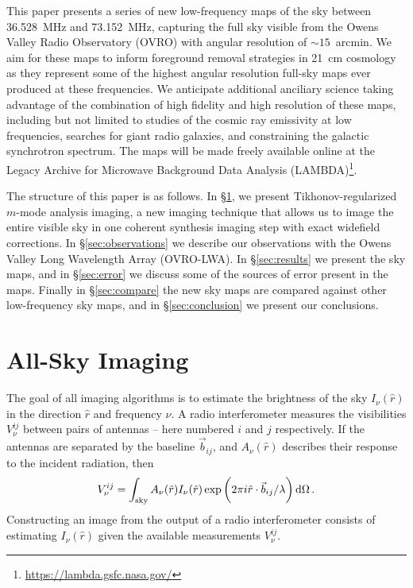 \documentclass[twocolumn]{aastex61}
\renewcommand{\d}{{\rm d}}
\begin{document}
This paper presents a series of new low-frequency maps of the sky between 36.528~MHz and 73.152~MHz,
capturing the full sky visible from the Owens Valley Radio Observatory (OVRO) with angular
resolution of $\sim 15$~arcmin. We aim for these maps to inform foreground removal strategies in
21~cm cosmology as they represent some of the highest angular resolution full-sky maps ever produced
at these frequencies. We anticipate additional anciliary science taking advantage of the combination
of high fidelity and high resolution of these maps, including but not limited to studies of the
cosmic ray emissivity at low frequencies, searches for giant radio galaxies, and constraining the
galactic synchrotron spectrum. The maps will be made freely available online at the Legacy Archive
for Microwave Background Data Analysis (LAMBDA)\footnote{\url{https://lambda.gsfc.nasa.gov/}}.

The structure of this paper is as follows. In \S\ref{sec:imaging}, we present Tikhonov-regularized
$m$-mode analysis imaging, a new imaging technique that allows us to image the entire visible sky in
one coherent synthesis imaging step with exact widefield corrections. In \S\ref{sec:observations} we
describe our observations with the Owens Valley Long Wavelength Array (OVRO-LWA). In
\S\ref{sec:results} we present the sky maps, and in \S\ref{sec:error} we discuss some of the sources
of error present in the maps. Finally in \S\ref{sec:compare} the new sky maps are compared against
other low-frequency sky maps, and in \S\ref{sec:conclusion} we present our conclusions.

\section{All-Sky Imaging}\label{sec:imaging}

The goal of all imaging algorithms is to estimate the brightness of the sky $I_\nu(\hat r)$ in the
direction $\hat r$ and frequency $\nu$. A radio interferometer measures the visibilities
$V^{ij}_{\nu}$ between pairs of antennas -- here numbered $i$ and $j$ respectively. If the antennas
are separated by the baseline $\vec b_{ij}$, and $A_\nu(\hat r)$ describes their response to the
incident radiation, then
\begin{equation}\label{eq:basic-imaging}
    V^{ij}_\nu = \int_\text{sky}
                 A_\nu(\hat r) I_\nu(\hat r)
                 \exp\bigg(2\pi i \hat r\cdot\vec b_{ij}/\lambda\bigg) \,\d\Omega \, .
\end{equation}
Constructing an image from the output of a radio interferometer consists of estimating $I_\nu(\hat
r)$ given the available measurements $V^{ij}_\nu$.
\end{document}
